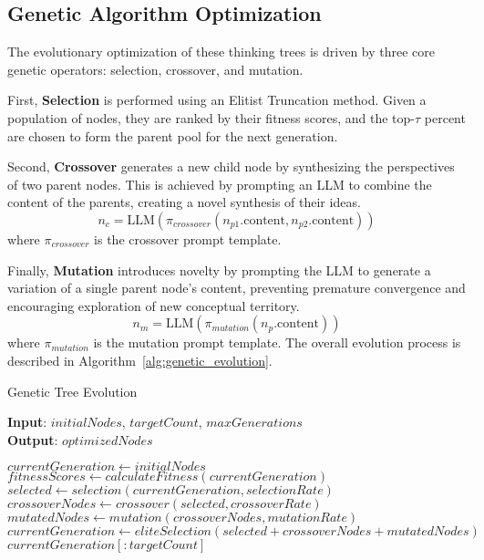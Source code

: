 \documentclass[letterpaper]{article} %
\begin{document}
\subsection{Genetic Algorithm Optimization}

The evolutionary optimization of these thinking trees is driven by three core genetic operators: selection, crossover, and mutation.

First, {\bfseries Selection} is performed using an Elitist Truncation method. Given a population of nodes, they are ranked by their fitness scores, and the top-$\tau$ percent are chosen to form the parent pool for the next generation.

Second, {\bfseries Crossover} generates a new child node by synthesizing the perspectives of two parent nodes. This is achieved by prompting an LLM to combine the content of the parents, creating a novel synthesis of their ideas.
\begin{equation}
n_c = \text{LLM}(\pi_{crossover}(n_{p1}.\text{content}, n_{p2}.\text{content}))
\end{equation}
where $\pi_{crossover}$ is the crossover prompt template.

Finally, {\bfseries Mutation} introduces novelty by prompting the LLM to generate a variation of a single parent node's content, preventing premature convergence and encouraging exploration of new conceptual territory.
\begin{equation}
n_m = \text{LLM}(\pi_{mutation}(n_p.\text{content}))
\end{equation}
where $\pi_{mutation}$ is the mutation prompt template.
The overall evolution process is described in Algorithm~\ref{alg:genetic_evolution}.

\begin{algorithm}[tb]
\caption{Genetic Tree Evolution}
\label{alg:genetic_evolution}
\textbf{Input}: $\mathit{initialNodes}$, $\mathit{targetCount}$, $\mathit{maxGenerations}$\\
\textbf{Output}: $\mathit{optimizedNodes}$
\begin{algorithmic}[1]
\State $\mathit{currentGeneration} \gets \mathit{initialNodes}$
    \State $\mathit{fitnessScores} \gets \mathit{calculateFitness}(\mathit{currentGeneration})$
    \State $\mathit{selected} \gets \mathit{selection}(\mathit{currentGeneration}, \mathit{selectionRate})$
    \State $\mathit{crossoverNodes} \gets \mathit{crossover}(\mathit{selected}, \mathit{crossoverRate})$
    \State $\mathit{mutatedNodes} \gets \mathit{mutation}(\mathit{crossoverNodes}, \mathit{mutationRate})$
    \State $\mathit{currentGeneration} \gets \mathit{eliteSelection}(\mathit{selected} + \mathit{crossoverNodes} + \mathit{mutatedNodes})$
\EndFor
\State \Return $\mathit{currentGeneration}[:\mathit{targetCount}]$
\end{algorithmic}
\end{algorithm}
\end{document}
